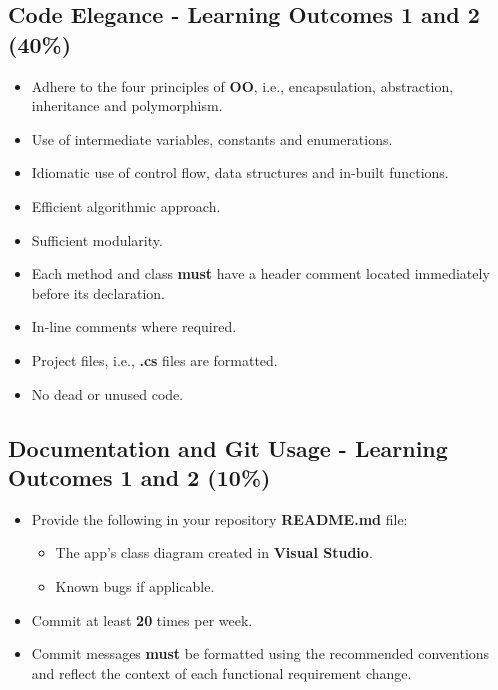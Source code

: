 \documentclass{article}
\begin{document}
\subsection*{Code Elegance - Learning Outcomes 1 and 2  (40\%)}
\begin{itemize}
    \item Adhere to the four principles of \textbf{OO}, i.e., encapsulation, abstraction, inheritance and polymorphism.
    \item Use of intermediate variables, constants and enumerations.
    \item Idiomatic use of control flow, data structures and in-built functions.
    \item Efficient algorithmic approach.
    \item Sufficient modularity.
    \item Each method and class \textbf{must} have a header comment located immediately before its declaration.
    \item In-line comments where required. 
    \item Project files, i.e., \textbf{.cs} files are formatted. 
    \item No dead or unused code.
\end{itemize}

\subsection*{Documentation and Git Usage - Learning Outcomes 1 and 2 (10\%)}
\begin{itemize}
    \item Provide the following in your repository \textbf{README.md} file:
    \begin{itemize}
        \item The app's class diagram created in \textbf{Visual Studio}.
        \item Known bugs if applicable.
    \end{itemize}
    \item Commit at least \textbf{20} times per week.
    \item Commit messages \textbf{must} be formatted using the recommended conventions and reflect the context of each functional requirement change.
\end{itemize}
\end{document}
